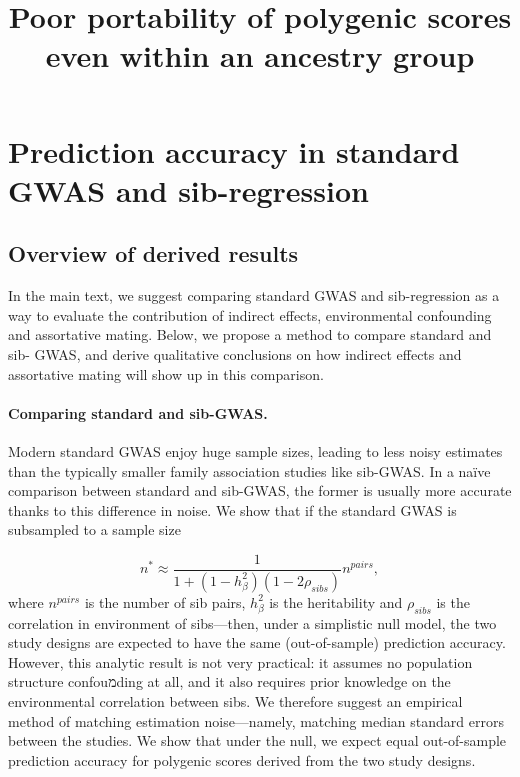 \documentclass[hidelinks, 12pt]{article}
\title{Poor portability of polygenic scores even within an ancestry group}
\newcommand{\beginsupplement}{%
    \setcounter{table}{0}
    \renewcommand{\thetable}{S\arabic{table}}%
    \setcounter{figure}{0}
    \renewcommand{\thefigure}{S\arabic{figure}}%
}
\begin{document}
 
\baselineskip24pt

\maketitle 
\begin{center}
\end{center}
\clearpage

\begingroup
  \hypersetup{hidelinks}
  \tableofcontents
\endgroup

\listoffigures
\listoftables

\pagebreak

\beginsupplement

\section{Prediction accuracy in standard GWAS and sib-regression}
\subsection{Overview of derived results}
In the main text, we suggest comparing standard GWAS and sib-regression as a way to evaluate the contribution of indirect effects, environmental confounding and assortative mating.  Below, we propose a method to compare standard and sib- GWAS, and derive qualitative conclusions on how indirect effects and assortative mating will show up in this comparison.  

\paragraph{Comparing standard and sib-GWAS.} Modern standard GWAS enjoy huge sample sizes, leading to less noisy estimates than the typically smaller family association studies like sib-GWAS.  In a na{\"i}ve comparison between standard and sib-GWAS, the former is usually more accurate thanks to this difference in noise.  We show that if the standard GWAS is subsampled to a sample size 

$$n^* \approx \frac{1}{1+(1-h_{\beta}^2)(1-2\rho_{sibs})}n^{pairs},$$
where $n^{pairs}$ is the number of sib pairs, $h_{\beta}^2$ is the heritability and $\rho_{sibs}$ is the correlation in environment of sibs---then, under a simplistic null model, the two study designs are expected to have the same (out-of-sample) prediction accuracy.  However, this analytic result is not very practical: it assumes no population structure confouמding at all, and it also requires prior knowledge on the environmental correlation between sibs.  We therefore suggest an empirical method of matching estimation noise---namely, matching median standard errors between the studies.  We show that under the null, we expect equal out-of-sample prediction accuracy for polygenic scores derived from the two study designs.  
\end{document}
